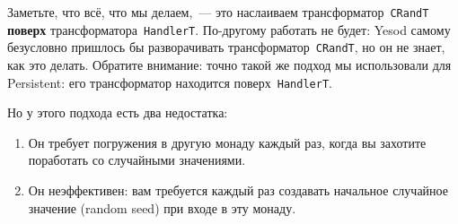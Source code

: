 Заметьте, что всё, что мы делаем,~--- это наслаиваем
трансформатор~\lstinline'CRandT' \textbf{поверх}
трансформатора~\lstinline'HandlerT'. По-другому работать не будет: Yesod самому
безусловно пришлось бы разворачивать трансформатор~\lstinline'CRandT', но он не
знает, как это делать. Обратите внимание: точно такой же подход мы использовали
для Persistent: его трансформатор находится поверх~\lstinline'HandlerT'.

Но у этого подхода есть два недостатка:
\begin{enumerate}
    \item Он требует погружения в другую монаду каждый раз, когда вы захотите
        поработать со случайными значениями.

    \item Он неэффективен: вам требуется каждый раз создавать начальное
        случайное значение (random seed) при входе в эту монаду.
\end{enumerate}

